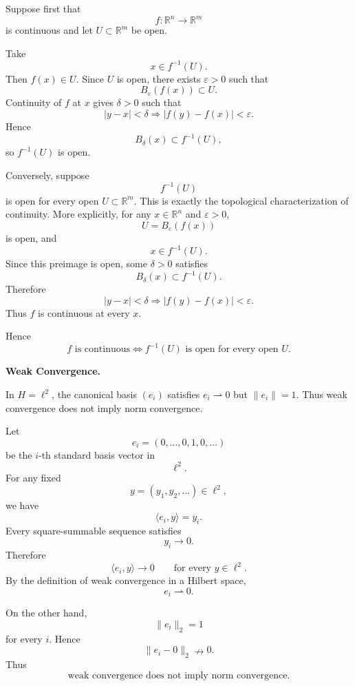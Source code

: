 \begin{solution}
Suppose first that
\[
f:\mathbb R^n\to\mathbb R^m
\]
is continuous and let \(U\subset\mathbb R^m\) be open.

Take
\[
x\in f^{-1}(U).
\]
Then \(f(x)\in U\). Since \(U\) is open, there exists \(\varepsilon>0\) such that
\[
B_\varepsilon(f(x))\subset U.
\]
Continuity of \(f\) at \(x\) gives \(\delta>0\) such that
\[
|y-x|<\delta
\Longrightarrow
|f(y)-f(x)|<\varepsilon.
\]
Hence
\[
B_\delta(x)\subset f^{-1}(U),
\]
so \(f^{-1}(U)\) is open.

Conversely, suppose
\[
f^{-1}(U)
\]
is open for every open \(U\subset\mathbb R^m\). This is exactly the topological
characterization of continuity. More explicitly, for any \(x\in\mathbb R^n\) and
\(\varepsilon>0\),
\[
U=B_\varepsilon(f(x))
\]
is open, and
\[
x\in f^{-1}(U).
\]
Since this preimage is open, some \(\delta>0\) satisfies
\[
B_\delta(x)\subset f^{-1}(U).
\]
Therefore
\[
|y-x|<\delta
\Longrightarrow
|f(y)-f(x)|<\varepsilon.
\]
Thus \(f\) is continuous at every \(x\).

Hence
\[
\boxed{
f\text{ is continuous}
\iff
f^{-1}(U)\text{ is open for every open }U.
}
\]
\end{solution}


\begin{problem}[CP-II-0056]
\label{prob:cp-ii-0056}
\textbf{Weak Convergence.}

\hspace*{1.5em}In $H=\ell^2$, the canonical basis $(e_i)$ satisfies $e_i\rightharpoonup0$
	but $\|e_i\|=1$.  Thus weak convergence does not imply norm convergence.

	\bigskip
\end{problem}

\begin{solution}
Let
\[
e_i=(0,\ldots,0,1,0,\ldots)
\]
be the \(i\)-th standard basis vector in
\[
\ell^2.
\]
For any fixed
\[
y=(y_1,y_2,\ldots)\in\ell^2,
\]
we have
\[
\langle e_i,y\rangle=y_i.
\]
Every square-summable sequence satisfies
\[
y_i\to0.
\]
Therefore
\[
\langle e_i,y\rangle\to0
\qquad
\text{for every }y\in\ell^2.
\]
By the definition of weak convergence in a Hilbert space,
\[
\boxed{e_i\rightharpoonup0.}
\]

On the other hand,
\[
\|e_i\|_2=1
\]
for every \(i\). Hence
\[
\|e_i-0\|_2\nrightarrow0.
\]
Thus
\[
\boxed{
\text{weak convergence does not imply norm convergence}.
}
\]
\end{solution}


